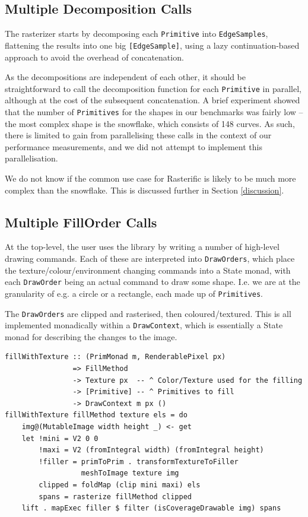 \documentclass[12pt, a4paper]{article}
\begin{document}
\subsection{Multiple Decomposition Calls}

The rasterizer starts by decomposing each \texttt{Primitive} into \texttt{EdgeSamples}, flattening the results into one big \texttt{[EdgeSample]}, using a lazy continuation-based approach to avoid the overhead of concatenation.

As the decompositions are independent of each other, it should be straightforward to call the decomposition function for each \texttt{Primitive} in parallel, although at the cost of the subsequent concatenation. A brief experiment showed that the number of \texttt{Primitives} for the shapes in our benchmarks was fairly low -- the most complex shape is the snowflake, which consists of 148 curves. As such, there is limited to gain from parallelising these calls in the context of our performance measurements, and we did not attempt to implement this parallelisation.

We do not know if the common use case for Rasterific is likely to be much more complex than the snowflake. This is discussed further in Section \ref{discussion}.

\subsection{Multiple FillOrder Calls}\label{sec:fillorder}

At the top-level, the user uses the library by writing a number of high-level drawing commands. Each of these are interpreted into \texttt{DrawOrders}, which place the texture/colour/environment changing commands into a State monad, with each \texttt{DrawOrder} being an actual command to draw some shape. I.e. we are at the granularity of e.g. a circle or a rectangle, each made up of \texttt{Primitives}.

The \texttt{DrawOrders} are clipped and rasterised, then coloured/textured. This is all implemented monadically within a \texttt{DrawContext}, which is essentially a State monad for describing the changes to the image.

\begin{lstlisting}[caption={Clipping, rasterising, and texturing the \texttt{DrawOrder}.}]
fillWithTexture :: (PrimMonad m, RenderablePixel px)
                => FillMethod
                -> Texture px  -- ^ Color/Texture used for the filling
                -> [Primitive] -- ^ Primitives to fill
                -> DrawContext m px ()
fillWithTexture fillMethod texture els = do
    img@(MutableImage width height _) <- get
    let !mini = V2 0 0
        !maxi = V2 (fromIntegral width) (fromIntegral height)
        !filler = primToPrim . transformTextureToFiller
                  meshToImage texture img
        clipped = foldMap (clip mini maxi) els
        spans = rasterize fillMethod clipped
    lift . mapExec filler $ filter (isCoverageDrawable img) spans
\end{lstlisting} %
\end{document}
